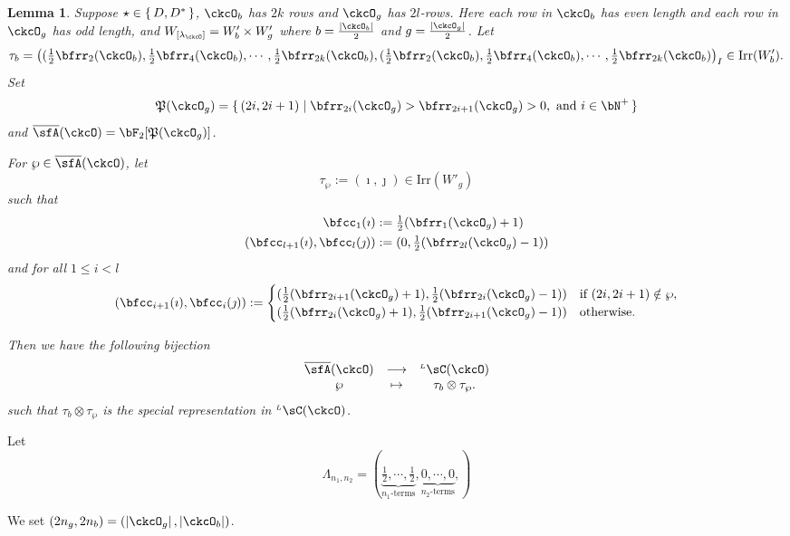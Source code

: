 \documentclass[12pt,a4paper]{amsart}
\def\abs#1{\left|{#1}\right|}
\newcommand{\CQ}{{\mathcal {Q}}}
\numberwithin{equation}{section}
\newtheorem{lem}[thm]{Lemma}
\theoremstyle{remark}
\def\half{{\tfrac{1}{2}}}
\def\Irr{\mathrm{Irr}}
\def\WLamck{W_{[\lambda_{\ckcO}]}}
\def\LC{{}^{\scriptscriptstyle L}\sC}
\def\CQ{\overline{\sfA}}%
\def\CPP{\mathfrak{P}}
\def\sP{\wp}
\begin{document}
\begin{lem}
  Suppose $\star \in \set{D, D^{*}}$, $\ckcO_{b}$ has $2k$ rows and $\ckcO_{g}$
  has $2l$-rows. Here each row in $\ckcO_{b}$ has even length and each row in
  $\ckcO_{g}$ has odd length, and $\WLamck = W'_{b}\times W'_{g}$ where
  $b= \frac{\abs{\ckcO_{b}}}{2}$ and $g = \frac{\abs{\ckcO_{g}}}{2}$. Let
  \[
    \tau_{b} = \left( (\half\bfrr_{2}(\ckcO_{b}), \half\bfrr_{4}(\ckcO_{b}),\cdots, \half\bfrr_{2k}(\ckcO_{b}), (\half\bfrr_{2}(\ckcO_{b}), \half\bfrr_{4}(\ckcO_{b}),\cdots, \half\bfrr_{2k}(\ckcO_{b}) \right)_{I}\in \Irr(W'_{b}).
  \]
  Set
  \[
    \CPP(\ckcO_{g}) = \set{(2i,2i+1)| \bfrr_{2i}(\ckcO_{g})> \bfrr_{2i+1}(\ckcO_{g})>0, \text{
        and } i\in \bN^{+}}
  \]
  and $\CQ(\ckcO)= \bF_{2}[\CPP(\ckcO_{g})]$.

  For $\sP \in \CQ(\ckcO)$, let
  \[
    \tau_{\sP} := (\imath,\jmath) \in \Irr(W'_{g})
  \]
  such that
  \[
    \begin{split}
      \bfcc_{1}(\imath)  &:= \half(\bfrr_{1}(\ckcO_{g})+1)\\
      (\bfcc_{l+1}(\imath), \bfcc_{l}(\jmath))  &:= (0,\half(\bfrr_{2l}(\ckcO_{g})-1))
    \end{split}
  \]
  and for all $1\leq i< l$
  \[
  (\bfcc_{i+1}(\imath), \bfcc_{i}(\jmath)):=
  \begin{cases}
    (\half (\bfrr_{2i+1}(\ckcO_{g})+1),
    \half (\bfrr_{2i}(\ckcO_{g})-1))
    & \text{if } (2i,2i+1)\notin \sP,\\
    (\half (\bfrr_{2i}(\ckcO_{g})+1),\half (\bfrr_{2i+1}(\ckcO_{g})-1)) & \text{otherwise.}
  \end{cases}
  \]

  Then we have the following bijection
  \[
    \begin{array}{ccc}
      \CQ(\ckcO) &\longrightarrow & \LC(\ckcO)\\
      \sP & \mapsto & \tau_{b}\otimes \tau_{\sP}.
    \end{array}
  \]
  such that $\tau_{b}\otimes \tau_{\sP}$ is the special representation in
  $\LC(\ckcO)$.
\end{lem}

Let \[
  \Lambda_{n_{1}, n_{2}} = (\underbrace{\half,\cdots,\half}_{n_{1}\text{-terms}}, \underbrace{0,\cdots,0}_{n_{2}\text{-terms}}, )
\]

We set $(2n_{g},2n_{b}) = (\abs{\ckcO_g},\abs{\ckcO_b})$.
\end{document}
